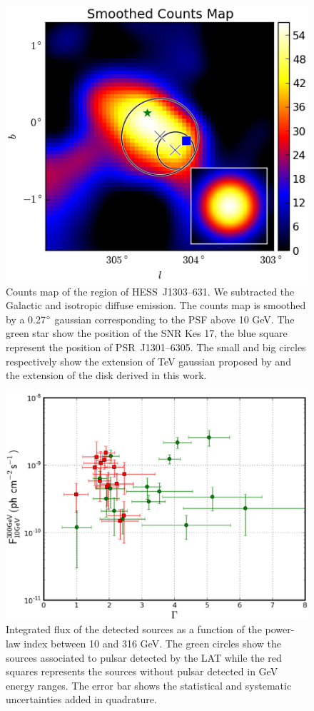 \begin{figure}[h!]
\centering
\includegraphics[]{figures/HESSJ1303m631.eps}
\caption{Counts map of the region of HESS~J1303--631. We subtracted the Galactic and isotropic diffuse emission. The counts map is smoothed by a 0.27$\mbox{$^\circ$}$ gaussian corresponding to the PSF above 10 GeV. The green star show the position of the SNR Kes 17, the blue square represent the position of PSR~J1301--6305. The small and big circles respectively show the extension of TeV gaussian proposed by \cite{2005AA...439.1013A} and the extension of the disk derived in this work.
\label{1303}}
\end{figure}

\begin{figure}[h!]
\centering
\includegraphics[width=\textwidth]{figures/out_errorbar_best_fit.eps}
\caption{Integrated flux of the detected sources as a function of the power-law index between 10 and 316 GeV. The green circles show the sources associated to pulsar detected by the LAT while the red squares represents the sources without pulsar detected in GeV energy ranges. The error bar shows the statistical and systematic uncertainties added in quadrature.  
\label{fig:fluxvssize}}
\end{figure}

